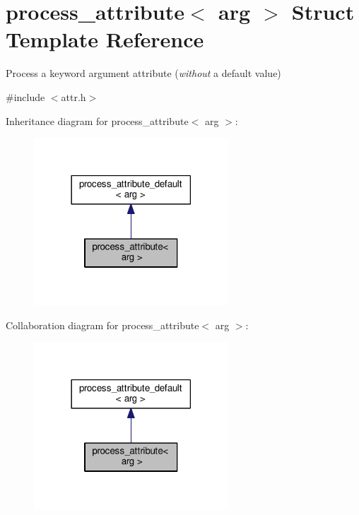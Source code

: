 \hypertarget{structprocess__attribute_3_01arg_01_4}{}\section{process\+\_\+attribute$<$ arg $>$ Struct Template Reference}
\label{structprocess__attribute_3_01arg_01_4}


Process a keyword argument attribute ({\itshape without} a default value)  




{\ttfamily \#include $<$attr.\+h$>$}



Inheritance diagram for process\+\_\+attribute$<$ arg $>$\+:
\nopagebreak
\begin{figure}[H]
\begin{center}
\leavevmode
\includegraphics[width=206pt]{structprocess__attribute_3_01arg_01_4__inherit__graph}
\end{center}
\end{figure}


Collaboration diagram for process\+\_\+attribute$<$ arg $>$\+:
\nopagebreak
\begin{figure}[H]
\begin{center}
\leavevmode
\includegraphics[width=206pt]{structprocess__attribute_3_01arg_01_4__coll__graph}
\end{center}
\end{figure}
